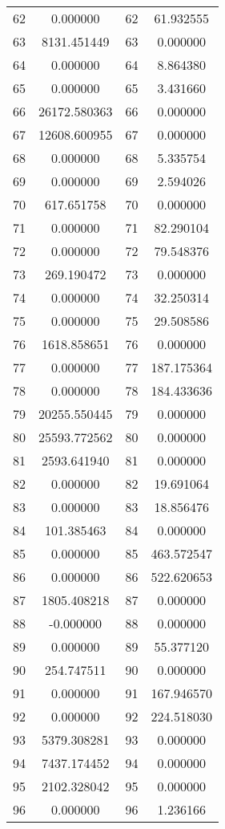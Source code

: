\documentclass[12pt]{article}
\begin{document}
\begin{longtable}{@{}cccc@{}}
62 & 0.000000 & 62 & 61.932555 \\
63 & 8131.451449 & 63 & 0.000000 \\
64 & 0.000000 & 64 & 8.864380 \\
65 & 0.000000 & 65 & 3.431660 \\
66 & 26172.580363 & 66 & 0.000000 \\
67 & 12608.600955 & 67 & 0.000000 \\
68 & 0.000000 & 68 & 5.335754 \\
69 & 0.000000 & 69 & 2.594026 \\
70 & 617.651758 & 70 & 0.000000 \\
71 & 0.000000 & 71 & 82.290104 \\
72 & 0.000000 & 72 & 79.548376 \\
73 & 269.190472 & 73 & 0.000000 \\
74 & 0.000000 & 74 & 32.250314 \\
75 & 0.000000 & 75 & 29.508586 \\
76 & 1618.858651 & 76 & 0.000000 \\
77 & 0.000000 & 77 & 187.175364 \\
78 & 0.000000 & 78 & 184.433636 \\
79 & 20255.550445 & 79 & 0.000000 \\
80 & 25593.772562 & 80 & 0.000000 \\
81 & 2593.641940 & 81 & 0.000000 \\
82 & 0.000000 & 82 & 19.691064 \\
83 & 0.000000 & 83 & 18.856476 \\
84 & 101.385463 & 84 & 0.000000 \\
85 & 0.000000 & 85 & 463.572547 \\
86 & 0.000000 & 86 & 522.620653 \\
87 & 1805.408218 & 87 & 0.000000 \\
88 & -0.000000 & 88 & 0.000000 \\
89 & 0.000000 & 89 & 55.377120 \\
90 & 254.747511 & 90 & 0.000000 \\
91 & 0.000000 & 91 & 167.946570 \\
92 & 0.000000 & 92 & 224.518030 \\
93 & 5379.308281 & 93 & 0.000000 \\
94 & 7437.174452 & 94 & 0.000000 \\
95 & 2102.328042 & 95 & 0.000000 \\
96 & 0.000000 & 96 & 1.236166 \\

\end{longtable}
\end{document}
